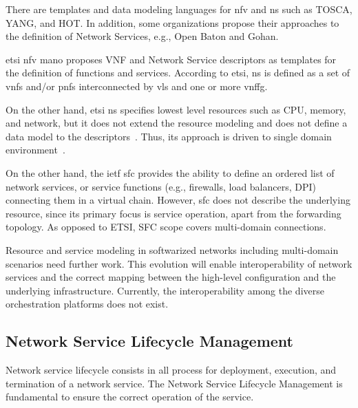 There are templates and data modeling languages for \acrfull{nfv} and \acrfull{ns} such as TOSCA, YANG, and HOT. In addition, some organizations propose their approaches to the definition of Network Services, e.g., Open Baton and Gohan.

\gls{etsi} \gls{nfv} \gls{mano} proposes VNF and Network Service descriptors as templates for the definition of functions and services. According to \gls{etsi}, \gls{ns} is defined as a set of \glspl{vnf} and/or \glspl{pnf} interconnected by \glspl{vl} and one or more \acrlong{vnffg}. 

On the other hand, \gls{etsi} \gls{ns} specifies lowest level resources such as CPU, memory, and network, but it does not extend the resource modeling and does not define a data model to the descriptors~\cite{Mijumbi2016ManagementVirtualizationb}. Thus, its approach is driven to single domain environment~\cite{Garay2016ServiceForward}. 

On the other hand, the \gls{ietf} \gls{sfc} provides the ability to define an ordered list of network services, or service functions (e.g., firewalls, load balancers, DPI) connecting them in a virtual chain. However, \gls{sfc} does not describe the underlying resource, since its primary focus is service operation, apart from the forwarding topology. As opposed to ETSI, SFC scope covers multi-domain connections.   

Resource and service modeling in softwarized networks including multi-domain scenarios need further work. This evolution will enable interoperability of network services and the correct mapping between the high-level configuration and the underlying infrastructure. Currently, the interoperability among the diverse orchestration platforms does not exist.




\subsection{Network Service Lifecycle Management}

Network service lifecycle consists in all process for deployment, execution, and termination of a network service. The Network Service Lifecycle Management is fundamental to ensure the correct operation of the service.

